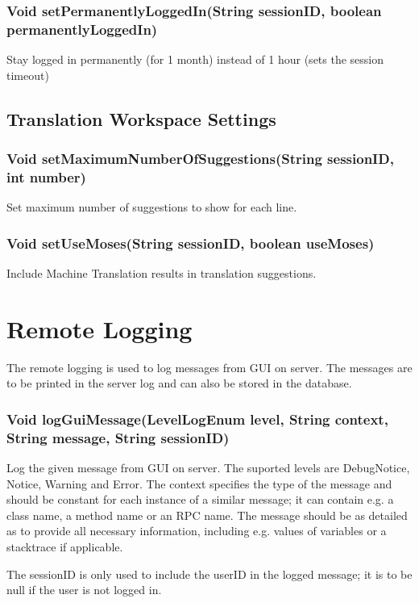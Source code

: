 \subsubsection{Void setPermanentlyLoggedIn(String sessionID, boolean permanentlyLoggedIn)}
Stay logged in permanently (for 1 month) instead of 1 hour (sets the session timeout)

\subsection{Translation Workspace Settings}

\subsubsection{Void setMaximumNumberOfSuggestions(String sessionID, int number)}
Set maximum number of suggestions to show for each line.

\subsubsection{Void setUseMoses(String sessionID, boolean useMoses)}
Include Machine Translation results in translation suggestions.

\section{Remote Logging}

The remote logging is used to log messages from GUI on server. The messages are to be printed in the server log and can also be stored in the database.

\subsubsection{Void logGuiMessage(LevelLogEnum level, String context, String message, String sessionID)}
Log the given message from GUI on server.
The suported levels are DebugNotice, Notice, Warning and Error.
The context specifies the type of the message and should be constant for each instance of a similar message; it can contain e.g. a class name, a method name or an RPC name. The message should be as detailed as to provide all necessary information, including e.g. values of variables or a stacktrace if applicable.

The sessionID is only used to include the userID in the logged message; it is to be null if the user is not logged in.

